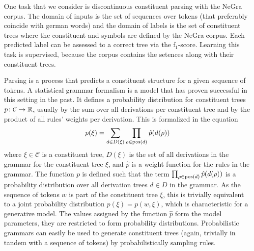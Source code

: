 \documentclass[../document.tex]{subfiles}
\begin{document}
    \begin{example}
        One task that we consider is discontinuous constituent parsing with the NeGra corpus.
        The domain of inputs is the set of sequences over tokens (that preferably coincide with german words) and the domain of labels is the set of constituent trees where the constituent and  symbols are defined by the NeGra corpus.
        Each predicted label can be assessed to a correct tree via the f$_1$-score.
        Learning this task is supervised, because the corpus contains the setences along with their constituent trees.

        Parsing is a process that predicts a constituent structure for a given sequence of tokens.
        A statistical grammar formalism is a model that has proven successful in this setting in the past.\cite{}
        It defines a probability distribution for constituent trees \(p\colon \mathcal{C} \to \mathbb{R}\), usually by the sum over all derivations per constituent tree and by the product of all rules' weights per derivation.
        This is formalized in the equation \[
        p(\xi) = \sum_{d \in D(\xi)} \prod_{\rho \in \operatorname{pos}(d)} \hat{p}(d(\rho))
        \]
        where \(\xi \in \mathcal{C}\) is a constituent tree, \(D(\xi)\) is the set of all derivations in the grammar for the constituent tree \(\xi\), and \(\hat{p}\) is a weight function for the rules in the grammar.
        The function \(\hat{p}\) is defined such that the term \(\prod_{\rho \in \operatorname{pos}(d)} \hat{p}(d(\rho))\) is a probability distribution over all derivation trees \(d \in D\) in the grammar.
        As the sequence of tokens \(w\) is part of the constituent tree \(\xi\), this is trivially equivalent to a joint probability distribution \(p(\xi) = p(w, \xi)\), which is characteristic for a generative model.
        The values assigned by the function \(\hat{p}\) form the model parameters, they are restricted to form probability distributions.
        Probabilistic grammars can easily be used to generate constituent trees (again, trivially in tandem with a sequence of tokens) by probabilistically sampling rules.
    \end{example}
\end{document}
